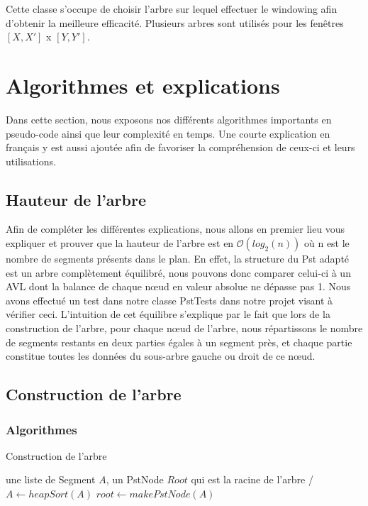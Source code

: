 \documentclass[10pt,a4paper]{article}
\begin{document}
Cette classe s'occupe de choisir l'arbre sur lequel effectuer le windowing afin d'obtenir la meilleure efficacité. Plusieurs arbres sont utilisés pour les fenêtres $[X, X']$ x $[Y, Y']$.

\newpage
\section{Algorithmes et explications}
Dans cette section, nous exposons nos différents algorithmes importants en pseudo-code ainsi que leur complexité en temps. Une courte explication en français y est aussi ajoutée afin de favoriser la compréhension de ceux-ci et leurs utilisations.

\subsection{Hauteur de l'arbre}
Afin de compléter les différentes explications, nous allons en premier lieu vous expliquer et prouver que la hauteur de l'arbre est en $\mathcal{O} ( log_2(n) ) $ où n est le nombre de segments présents dans le plan. En effet, la structure du Pst adapté est un arbre complètement équilibré, nous pouvons donc comparer celui-ci à un AVL dont la balance de chaque nœud en valeur absolue ne dépasse pas 1.
Nous avons effectué un test dans notre classe PstTests dans notre projet visant à vérifier ceci. L'intuition de cet équilibre s'explique par le fait que lors de la construction de l’arbre, pour chaque nœud de l'arbre, nous répartissons le nombre de segments restants en deux parties égales à un segment près, et chaque partie constitue toutes les données du sous-arbre gauche ou droit de ce nœud.

\subsection{Construction de l'arbre}

\subsubsection{Algorithmes}

\begin{algorithm}
\caption{Construction de l'arbre}
\begin{algorithmic}[1]
\REQUIRE une liste de Segment $A$, un PstNode $Root$ qui est la racine de l'arbre 
\ENSURE /
\STATE $A \leftarrow heapSort(A)$
\STATE $root \leftarrow makePstNode(A) $
\end{algorithmic}
\end{algorithm}
\end{document}
